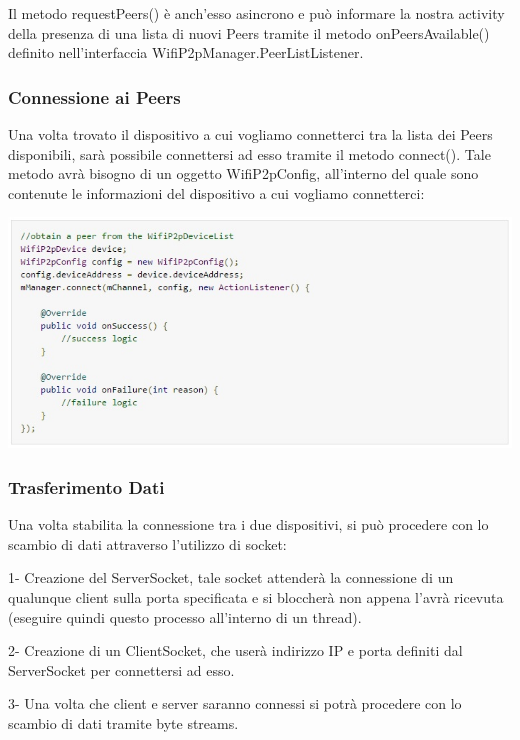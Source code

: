 Il metodo requestPeers() è anch'esso asincrono e può informare la nostra activity della presenza di una lista di nuovi Peers tramite il metodo onPeersAvailable() definito nell'interfaccia WifiP2pManager.PeerListListener.

\subsubsection{Connessione ai Peers}

Una volta trovato il dispositivo a cui vogliamo connetterci tra la lista dei Peers disponibili, sarà possibile connettersi ad esso tramite il metodo connect().
Tale metodo avrà bisogno di un oggetto WifiP2pConfig, all'interno del quale sono contenute le informazioni del dispositivo a cui vogliamo connetterci:

\begin{center}
\includegraphics[width=1\textwidth]{imgs/connect.jpg}
\label{connect_img}%
\end{center}

\subsubsection{Trasferimento Dati}

Una volta stabilita la connessione tra i due dispositivi, si può procedere con lo scambio di dati attraverso l'utilizzo di socket:

1- Creazione del ServerSocket, tale socket attenderà la connessione di un qualunque client sulla porta specificata e si bloccherà non appena l'avrà ricevuta (eseguire quindi questo processo all'interno di un thread).

2- Creazione di un ClientSocket, che userà indirizzo IP e porta definiti dal ServerSocket per connettersi ad esso.

3- Una volta che client e server saranno connessi si potrà procedere con lo scambio di dati tramite byte streams.

